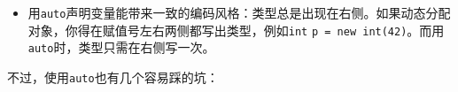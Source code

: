 \begin{itemize}

\begin{codeblockbg}
\begin{Verbatim}[commandchars=\\\{\},breaklines=true,breakanywhere=true,fontsize=\codefont,xleftmargin=17bp]
\PYG{n}{std}\PYG{o}{:}\PYG{o}{:}\PYG{n}{map}\PYG{o}{\PYGZlt{}}\PYG{k+kt}{int}\PYG{p}{,}\PYG{+w}{ }\PYG{n}{std}\PYG{o}{:}\PYG{o}{:}\PYG{n}{string}\PYG{o}{\PYGZgt{}}\PYG{+w}{ }\PYG{n}{m}\PYG{p}{;}
\PYG{k}{for}\PYG{+w}{ }\PYG{p}{(}\PYG{n}{std}\PYG{o}{:}\PYG{o}{:}\PYG{n}{map}\PYG{o}{\PYGZlt{}}\PYG{k+kt}{int}\PYG{p}{,}\PYG{n}{std}\PYG{o}{:}\PYG{o}{:}\PYG{n}{string}\PYG{o}{\PYGZgt{}}\PYG{o}{:}\PYG{o}{:}\PYG{n}{const\PYGZus{}iterator}\PYG{+w}{ }\PYG{n}{it}\PYG{+w}{ }\PYG{o}{=}\PYG{+w}{ }\PYG{n}{m}\PYG{p}{.}\PYG{n}{cbegin}\PYG{p}{(}\PYG{p}{)}\PYG{p}{;}
\PYG{+w}{  }\PYG{n}{it}\PYG{+w}{ }\PYG{o}{!}\PYG{o}{=}\PYG{+w}{ }\PYG{n}{m}\PYG{p}{.}\PYG{n}{cend}\PYG{p}{(}\PYG{p}{)}\PYG{p}{;}\PYG{+w}{ }\PYG{o}{+}\PYG{o}{+}\PYG{n}{it}\PYG{p}{)}
\PYG{p}{\PYGZob{}}\PYG{+w}{ }\PYG{c+cm}{/*...*/}\PYG{+w}{ }\PYG{p}{\PYGZcb{}}
\PYG{k}{for}\PYG{+w}{ }\PYG{p}{(}\PYG{k}{auto}\PYG{+w}{ }\PYG{n}{it}\PYG{+w}{ }\PYG{o}{=}\PYG{+w}{ }\PYG{n}{m}\PYG{p}{.}\PYG{n}{cbegin}\PYG{p}{(}\PYG{p}{)}\PYG{p}{;}\PYG{+w}{ }\PYG{n}{it}\PYG{+w}{ }\PYG{o}{!}\PYG{o}{=}\PYG{+w}{ }\PYG{n}{m}\PYG{p}{.}\PYG{n}{cend}\PYG{p}{(}\PYG{p}{)}\PYG{p}{;}\PYG{+w}{ }\PYG{o}{+}\PYG{o}{+}\PYG{n}{it}\PYG{p}{)}
\PYG{p}{\PYGZob{}}\PYG{+w}{ }\PYG{c+cm}{/*...*/}\PYG{+w}{ }\PYG{p}{\PYGZcb{}}
\end{Verbatim}
\end{codeblockbg}



\item 用\texttt{auto}声明变量能带来一致的编码风格：类型总是出现在右侧。如果动态分配对象，你得在赋值号左右两侧都写出类型，例如\texttt{int} \texttt{p = new int(\allowbreak{}42)}。而用\texttt{auto}时，类型只需在右侧写一次。

\end{itemize}



不过，使用\texttt{auto}也有几个容易踩的坑：



